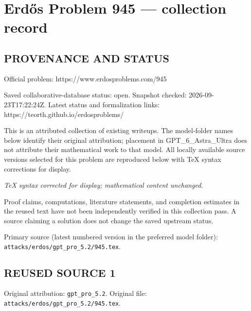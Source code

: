 \section*{Erd\H{o}s Problem 945 --- collection record}

\subsection*{PROVENANCE AND STATUS}
Official problem: https://www.erdosproblems.com/945

Saved collaborative-database status: open.
Snapshot checked: 2026-09-23T17:22:24Z.
Latest status and formalization links: https://teorth.github.io/erdosproblems/

This is an attributed collection of existing writeups. The model-folder names below identify their original attribution; placement in GPT\_6\_Astra\_Ultra does not attribute their mathematical work to that model. All locally available source versions selected for this problem are reproduced below with TeX syntax corrections for display.

\emph{TeX syntax corrected for display; mathematical content unchanged.}

Proof claims, computations, literature statements, and completion estimates in the reused text have not been independently verified in this collection pass. A source claiming a solution does not change the saved upstream status.

Primary source (latest numbered version in the preferred model folder): \texttt{attacks/erdos/gpt\_pro\_5.2/945.tex}.

\subsection*{REUSED SOURCE 1}
Original attribution: \texttt{gpt\_pro\_5.2}.
Original file: \texttt{attacks/erdos/gpt\_pro\_5.2/945.tex}.


